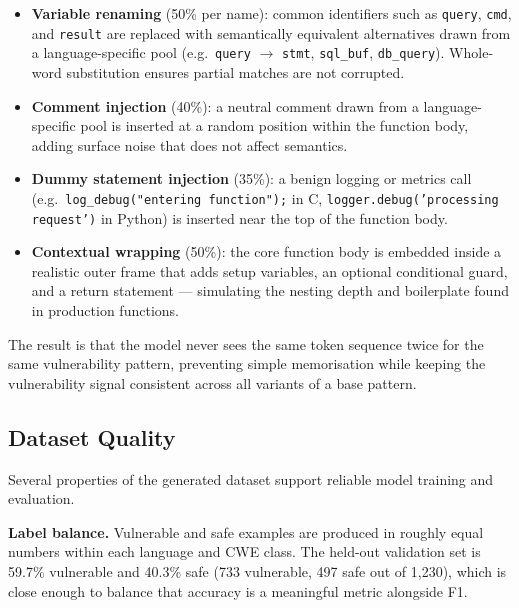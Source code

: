 \begin{itemize}
  \item \textbf{Variable renaming} (50\% per name): common identifiers such as
        \texttt{query}, \texttt{cmd}, and \texttt{result} are replaced with semantically
        equivalent alternatives drawn from a language-specific pool
        (e.g.\ \texttt{query} $\to$ \texttt{stmt}, \texttt{sql\_buf}, \texttt{db\_query}).
        Whole-word substitution ensures partial matches are not corrupted.

  \item \textbf{Comment injection} (40\%): a neutral comment drawn from a
        language-specific pool is inserted at a random position within the function body,
        adding surface noise that does not affect semantics.

  \item \textbf{Dummy statement injection} (35\%): a benign logging or metrics call
        (e.g.\ \texttt{log\_debug("entering function");} in C,
        \texttt{logger.debug('processing request')} in Python) is inserted near the
        top of the function body.

  \item \textbf{Contextual wrapping} (50\%): the core function body is embedded inside
        a realistic outer frame that adds setup variables, an optional conditional guard,
        and a return statement --- simulating the nesting depth and boilerplate found in
        production functions.
\end{itemize}

The result is that the model never sees the same token sequence twice for the same
vulnerability pattern, preventing simple memorisation while keeping the vulnerability
signal consistent across all variants of a base pattern.

\subsection{Dataset Quality}

Several properties of the generated dataset support reliable model training and
evaluation.

\textbf{Label balance.}
Vulnerable and safe examples are produced in roughly equal numbers within each language
and CWE class.
The held-out validation set is 59.7\% vulnerable and 40.3\% safe (733 vulnerable,
497 safe out of 1{,}230), which is close enough to balance that accuracy is a
meaningful metric alongside F1.

